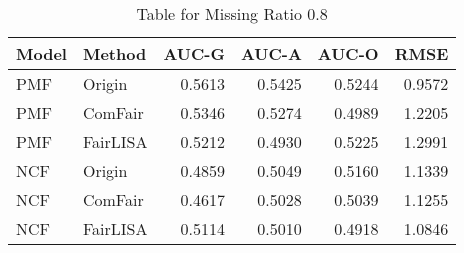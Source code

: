 \begin{table}
\centering
\caption{Table for Missing Ratio 0.8}
\label{tab:missing_0.8}
\begin{tabular}{llrrrr}
\toprule
Model &   Method &  AUC-G &  AUC-A &  AUC-O &   RMSE \\
\midrule
  PMF &   Origin & 0.5613 & 0.5425 & 0.5244 & 0.9572 \\
  PMF &  ComFair & 0.5346 & 0.5274 & 0.4989 & 1.2205 \\
  PMF & FairLISA & 0.5212 & 0.4930 & 0.5225 & 1.2991 \\
  NCF &   Origin & 0.4859 & 0.5049 & 0.5160 & 1.1339 \\
  NCF &  ComFair & 0.4617 & 0.5028 & 0.5039 & 1.1255 \\
  NCF & FairLISA & 0.5114 & 0.5010 & 0.4918 & 1.0846 \\
\bottomrule
\end{tabular}
\end{table}

